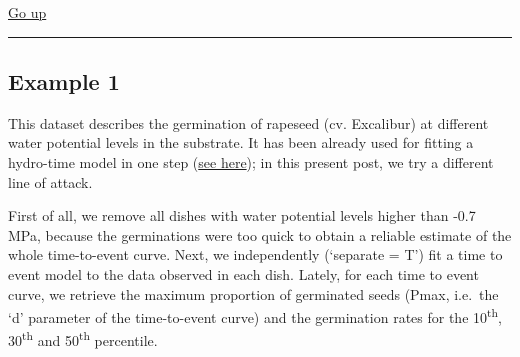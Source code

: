 \documentclass[
]{book}
\begin{document}
\protect\hyperlink{a-possibly-incomplete-list-of-threshold-models}{Go up}

\begin{center}\rule{0.5\linewidth}{0.5pt}\end{center}

\hypertarget{example-1}{%
\subsection{Example 1}\label{example-1}}

This dataset describes the germination of rapeseed (cv. Excalibur) at different water potential levels in the substrate. It has been already used for fitting a hydro-time model in one step (\href{https://www.statforbiology.com/2022/stat_drcte_6-ht1step/}{see here}); in this present post, we try a different line of attack.

First of all, we remove all dishes with water potential levels higher than -0.7 MPa, because the germinations were too quick to obtain a reliable estimate of the whole time-to-event curve. Next, we independently (`separate = T') fit a time to event model to the data observed in each dish. Lately, for each time to event curve, we retrieve the maximum proportion of germinated seeds (Pmax, i.e.~the `d' parameter of the time-to-event curve) and the germination rates for the 10\textsuperscript{th}, 30\textsuperscript{th} and 50\textsuperscript{th} percentile.
\end{document}
